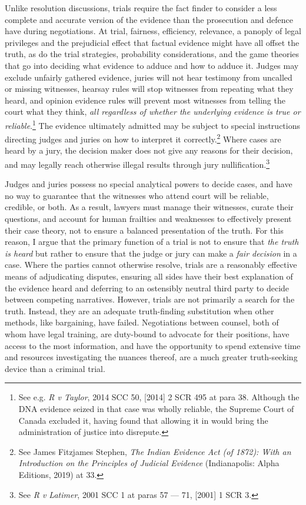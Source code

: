 Unlike resolution discussions, trials require the fact finder to consider a less complete and accurate version of the evidence than the prosecution and defence have during negotiations. At trial, fairness, efficiency, relevance, a panoply of legal privileges and the prejudicial effect that factual evidence might have all offset the truth, as do the trial strategies, probability considerations, and the game theories that go into deciding what evidence to adduce and how to adduce it. Judges may exclude unfairly gathered evidence, juries will not hear testimony from uncalled or missing witnesses, hearsay rules will stop witnesses from repeating what they heard, and opinion evidence rules will prevent most witnesses from telling the court what they think, \textit{all regardless of whether the underlying evidence is true or reliable}.\footnote{See e.g. \textit{R v Taylor}, 2014 SCC 50, [2014] 2 SCR 495 at para 38. Although the DNA evidence seized in that case was wholly reliable, the Supreme Court of Canada excluded it, having found that allowing it in would bring the administration of justice into disrepute.} The evidence ultimately admitted may be subject to special instructions directing judges and juries on how to interpret it correctly.\footnote{See James Fitzjames Stephen, \textit{The Indian Evidence Act (of 1872): With an Introduction on the Principles of Judicial Evidence} (Indianapolis: Alpha Editions, 2019) at 33.} Where cases are heard by a jury, the decision maker does not give any reasons for their decision, and may legally reach otherwise illegal results through jury nullification.\footnote{See \textit{R v Latimer}, 2001 SCC 1 at paras 57 — 71, [2001] 1 SCR 3.}

Judges and juries possess no special analytical powers to decide cases, and have no way to guarantee that the witnesses who attend court will be reliable, credible, or both. As a result, lawyers must manage their witnesses, curate their questions, and account for human frailties and weaknesses to effectively present their case theory, not to ensure a balanced presentation of the truth. For this reason, I argue that the primary function of a trial is not to ensure that \textit{the truth is heard} but rather to ensure that the judge or jury can make a \textit{fair decision} in a case. Where the parties cannot otherwise resolve, trials are a reasonably effective means of adjudicating disputes, ensuring all sides have their best explanation of the evidence heard and deferring to an ostensibly neutral third party to decide between competing narratives. However, trials are not primarily a search for the truth. Instead, they are an adequate truth-finding substitution when other methods, like bargaining, have failed. Negotiations between counsel, both of whom have legal training, are duty-bound to advocate for their positions, have access to the most information, and have the opportunity to spend extensive time and resources investigating the nuances thereof, are a much greater truth-seeking device than a criminal trial.

